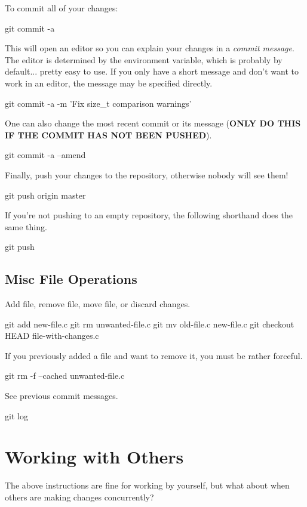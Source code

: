 To commit all of your changes:
\begin{code}
git commit -a
\end{code}
This will open an editor so you can explain your changes in a \textit{commit message}.
The editor is determined by the  environment variable, which is probably  by default... pretty easy to use.
If you only have a short message and don't want to work in an editor, the message may be specified directly.
\begin{code}
git commit -a -m 'Fix size_t comparison warnings'
\end{code}

One can also change the most recent commit or its message (\textbf{ONLY DO THIS IF THE COMMIT HAS NOT BEEN PUSHED}).
\begin{code}
git commit -a --amend
\end{code}

Finally, push your changes to the repository, otherwise nobody will see them!
\begin{code}
git push origin master
\end{code}
If you're not pushing to an empty repository, the following shorthand does the same thing.
\begin{code}
git push
\end{code}

\subsection{Misc File Operations}
Add file, remove file, move file, or discard changes.
\begin{code}
git add new-file.c
git rm unwanted-file.c
git mv old-file.c new-file.c
git checkout HEAD file-with-changes.c
\end{code}

If you previously added a file and want to remove it, you must be rather forceful.
\begin{code}
git rm -f --cached unwanted-file.c
\end{code}

See previous commit messages.
\begin{code}
git log
\end{code}

\section{Working with Others}
The above instructions are fine for working by yourself, but what about when others are making changes concurrently?

